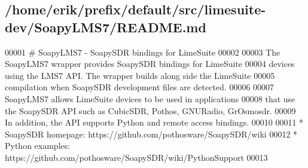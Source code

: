 \subsection{/home/erik/prefix/default/src/limesuite-\/dev/\+Soapy\+L\+M\+S7/\+R\+E\+A\+D\+ME.md}

\begin{DoxyCode}
00001 # SoapyLMS7 - SoapySDR bindings for LimeSuite
00002 
00003 The SoapyLMS7 wrapper provides SoapySDR bindings for LimeSuite
00004 devices using the LMS7 API. The wrapper builds along side the LimeSuite
00005 compilation when SoapySDR development files are detected.
00006 
00007 SoapyLMS7 allows LimeSuite devices to be used in applications
00008 that use the SoapySDR API such as CubicSDR, Pothos, GNURadio, GrOsmosdr.
00009 In addition, the API supports Python and remote access bindings.
00010 
00011 * SoapySDR homepage: https://github.com/pothosware/SoapySDR/wiki
00012 * Python examples: https://github.com/pothosware/SoapySDR/wiki/PythonSupport
00013 
\end{DoxyCode}
